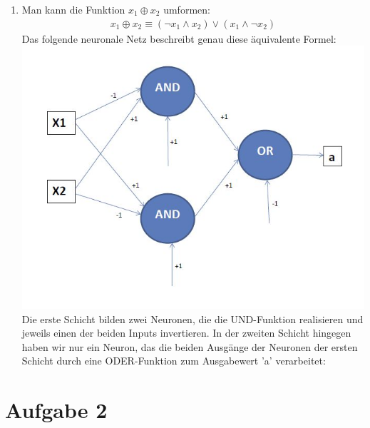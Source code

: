 \documentclass[a4paper,10pt]{article}
\begin{document}
\begin{enumerate}[~~a.)]
	 \item
    Man kann die Funktion $x_1 \oplus x_2$ umformen:
    \begin{align*}
        x_1 \oplus x_2 \equiv (\lnot x_1 \land x_2) \lor (x_1 \land \lnot x_2)
    \end{align*}
    Das folgende neuronale Netz beschreibt genau diese äquivalente Formel: \\
        \includegraphics[scale=0.65]{network.jpg} \\
    Die erste Schicht bilden zwei Neuronen, die die UND-Funktion realisieren und jeweils einen der beiden Inputs invertieren. In der zweiten Schicht hingegen haben wir nur ein Neuron, das die beiden Ausgänge der Neuronen der ersten Schicht durch eine ODER-Funktion zum Ausgabewert 'a' verarbeitet: 
	\end{enumerate}

\section*{Aufgabe 2}
\end{document}
